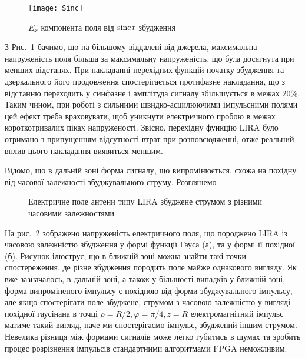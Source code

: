 \begin{figure}[h] \begin{center}
\texttt{[image: Sinc]}
\caption{$ E_x $ компонента поля від $ \operatorname{sinc} t $ збудження}
\label{fig:ex_sinc}
\end{center} \end{figure}

З Рис.~\ref{fig:ex_sinc} бачимо, що на більшому віддалені від джерела, 
максимальна напруженість поля більша за максимальну напруженість, що була 
досягнута при менших відстанях. При накладанні перехідних функцій початку 
збудження та дзеркального його продовження спостерігається протифазне 
накладання, що з відстанню переходить у синфазне і амплітуда сигналу 
збільшується в межах $ 20\% $. Таким чином, при роботі з сильними 
швидко-асцилюючими імпульсними полями цей ефект треба враховувати, щоб 
уникнути електричного пробою в межах короткотривалих піках напруженості.
Звісно, перехідну функцію LIRA було отримано з припущенням відсутності 
втрат при розповсюдженні, отже реальний вплив цього накладання виявиться 
меншим.

Відомо, що в дальній зоні форма сигналу, що випромінюється, схожа на похідну
від часової залежності збуджувального струму. Розглянемо 

\begin{figure}
\caption{Електричне поле антени типу LIRA збуджене струмом з 
різними часовими залежностями}
\label{fig:gauss_shape}
\end{figure}

На рис.~\ref{fig:gauss_shape} зображено напруженість електричного поля, 
що породжено LIRA із часовою залежністю збудження у формі функції Гауса (а), 
та у формі її похідної (б). Рисунок ілюструє, що в ближній зоні можна знайти
такі точки спостереження, де різне збудження породить поле майже однакового 
вигляду. Як вже зазначалось, в дальній зоні, а також у більшості випадків у 
ближній зоні, форма випроміненого імпульсу є похідною від форми збуджувального 
імпульсу, але якщо спостерігати поле збуджене, струмом з часовою залежністю у 
вигляді похідної гаусінана в точці $ \rho = R/2, \varphi = \pi/4, z = R $
електромагнітний імпульс матиме такий вигляд, наче ми спостерігаємо імпульс, 
збуджений іншим струмом. Невелика різниця між формами сигналів може легко 
губитись в шумах та зробить процес розрізнення імпульсів стандартними 
алгоритмами FPGA неможливим.


